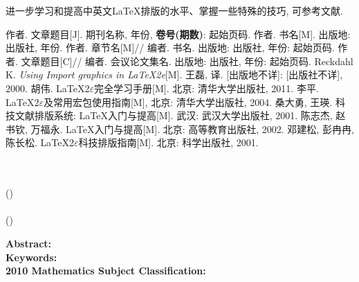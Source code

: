 \documentclass[a4paper,c5size,onecolumn,twoside,cap,Chinese]{APSart}
\begin{document}
\begin{remark}
进一步学习和提高中英文\LaTeX 排版的水平、掌握一些特殊的技巧,
可参考文献.
\end{remark}

\vspace{6mm}
\begin{thebibliography}{99}
\addtolength{\itemsep}{-0.8 em} %
   作者. 文章题目[J]. {\kaishu 期刊名称}, 年份, {\bf 卷号(期数)}: 起始页码.
   作者. {\kaishu 书名}[M]. 出版地: 出版社, 年份.
   作者. {\kaishu 章节名}[M]// 编者. {\kaishu 书名}. 出版地: 出版社, 年份: 起始页码.
   作者. 文章题目[C]// 编者. {\kaishu 会议论文集名}. 出版地: 出版社, 年份: 起始页码.
   Reckdahl K. {\it Using Import graphics in \LaTeX2e}[M]. 王磊, 译. [出版地不详]: [出版社不详], 2000.
   胡伟. {\kaishu \LaTeX{}2$\varepsilon$完全学习手册}[M]. 北京: 清华大学出版社, 2011.
   李平. {\kaishu \LaTeX{}2$\varepsilon$及常用宏包使用指南}[M], 北京: 清华大学出版社, 2004.
   桑大勇, 王瑛. {\kaishu 科技文献排版系统: \LaTeX 入门与提高}[M]. 武汉: 武汉大学出版社, 2001.
   陈志杰, 赵书钦, 万福永. {\kaishu \LaTeX{}入门与提高}[M]. 北京: 高等教育出版社, 2002.
   邓建松, 彭冉冉, 陈长松. {\kaishu \LaTeX{}2$\varepsilon$科技排版指南}[M]. 北京: 科学出版社, 2001.
\end{thebibliography}

\vspace{6mm}\hspace{-8mm}
\parbox{\textwidth}{
\begin{center}
\Large{\bf{\entitle}}\\[1em]
\textrm{\enfirstauthor}\\[0.2em]
(\textit{\enfirstinst})\\[0.8em]
\textrm{\ensecondauthor}\\[0.2em]
(\textit{\ensecondinst})
\end{center}

\mbox{}\hspace{2em}\textbf{Abstract:}\quad\enabstract\\
\mbox{}\hspace{2em}\textbf{Keywords:}\quad\enkeywords\\
\mbox{}\hspace{2em}\textbf{2010 Mathematics Subject Classification:}\quad\amsno}

\clearpage
\end{document}
